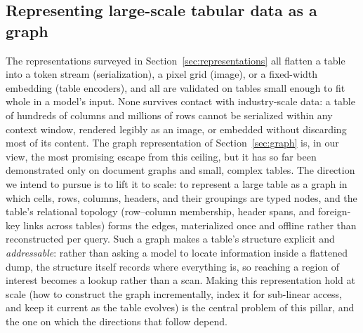 \subsection{Representing large-scale tabular data as a graph}
\label{sec:future-representation}
The representations surveyed in Section~\ref{sec:representations} all flatten a table into a token stream (serialization), a pixel grid (image), or a fixed-width embedding (table encoders), and all are validated on tables small enough to fit whole in a model's input. None survives contact with industry-scale data: a table of hundreds of columns and millions of rows cannot be serialized within any context window, rendered legibly as an image, or embedded without discarding most of its content. The graph representation of Section~\ref{sec:graph} is, in our view, the most promising escape from this ceiling, but it has so far been demonstrated only on document graphs and small, complex tables. The direction we intend to pursue is to lift it to scale: to represent a large table as a graph in which cells, rows, columns, headers, and their groupings are typed nodes, and the table's relational topology (row--column membership, header spans, and foreign-key links across tables) forms the edges, materialized once and offline rather than reconstructed per query. Such a graph makes a table's structure explicit and \emph{addressable}: rather than asking a model to locate information inside a flattened dump, the structure itself records where everything is, so reaching a region of interest becomes a lookup rather than a scan. Making this representation hold at scale (how to construct the graph incrementally, index it for sub-linear access, and keep it current as the table evolves) is the central problem of this pillar, and the one on which the directions that follow depend.

